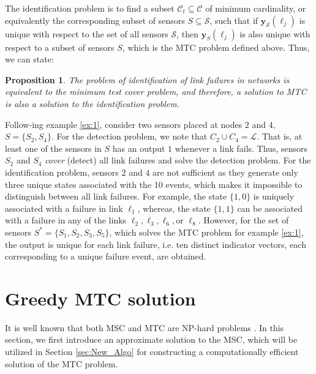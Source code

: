 \documentclass[twocolumn]{autart}
\newtheorem{proposition}[theorem]{\bf Proposition}
\begin{document}
The identification problem is to find a subset $\mathcal{C}_t\subseteq\mathcal{C}$ of minimum cardinality, or equivalently the corresponding subset of sensors $S\subseteq\mathcal{S}$, such that if $\mathbf{y}_\mathcal{S}(\ell_j)$ is unique with respect to the set of all sensors $\mathcal{S}$, then $\mathbf{y}_S(\ell_j)$ is also unique with respect to a subset of sensors $S$, which is the MTC problem defined above. Thus, we can state:

\begin{proposition} The problem of identification of link failures in networks is equivalent to the minimum test cover problem, and therefore, a solution to MTC is also a solution to the identification problem.
\end{proposition}

\begin{exmp} \label{exmp:2}
Follow-ing example \ref{ex:1}, consider two sensors placed at nodes 2 and 4, $S = \{S_2,S_4\}$. 
For the detection problem, we note that $C_2\cup C_4 = \mathcal{L}$. That is, at least one of the sensors in $S$ has an output $1$ whenever a link fails. Thus, sensors $S_2$ and $S_4$ \textit{cover} (detect) all link failures and solve the detection problem. 
For the identification problem, sensors $2$ and $4$ are not sufficient as they generate only three unique states associated with the 10 events, which makes it impossible to distinguish between all link failures. For example, the state $\{1,0\}$ is uniquely associated with a failure in link $\ell_1$, whereas, the state $\{1,1\}$ can be associated with a failure in any of the links $\ell_2,\ell_3, \ell_6, \text{or } \ell_8$. 
However, for the set of sensors $S^* = \{S_1,S_2,S_3,S_5 \}$, which solves the MTC problem for example \ref{ex:1}, the output is unique for each link failure, i.e. ten distinct indicator vectors, each corresponding to a unique failure event, are obtained.
\end{exmp}

\section{Greedy MTC solution} \label{sec:oldsol} \vspace{-0.35cm}
It is well known that both MSC and MTC are NP-hard problems \cite{Garey1,vazirani2013approximation}. In this section, we first introduce an approximate solution to the MSC, which will be utilized in Section \ref{sec:New_Algo} for constructing a computationally efficient solution of the MTC problem.
\end{document}
